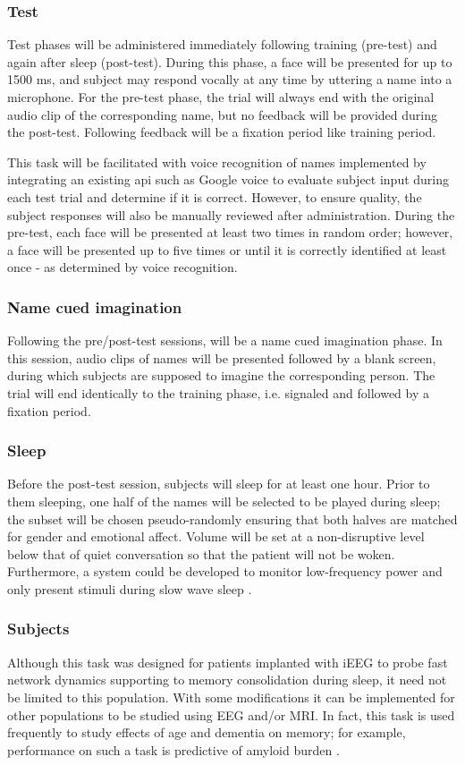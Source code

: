 \subsubsection*{Test}
Test phases will be administered immediately following training (pre-test) and again after sleep (post-test). During this phase, a face will be presented for up to 1500 ms, and subject may respond vocally at any time by uttering a name into a microphone. For the pre-test phase, the trial will always end with the original audio clip of the corresponding name, but no feedback will be provided during the post-test. Following feedback will be a fixation period like training period.

This task will be facilitated with voice recognition of names implemented by integrating an existing api such as Google voice to evaluate subject input during each test trial and determine if it is correct. However, to ensure quality, the subject responses will also be manually reviewed after administration. During the pre-test, each face will be presented at least two times in random order; however, a face will be presented up to five times or until it is correctly identified at least once - as determined by voice recognition.

\subsubsection*{Name cued imagination}
Following the pre/post-test sessions, will be a name cued imagination phase. In this session, audio clips of names will be presented followed by a blank screen, during which subjects are supposed to imagine the corresponding person. The trial will end identically to the training phase, i.e. signaled and followed by a fixation period.

\subsubsection*{Sleep}
Before the post-test session, subjects will sleep for at least one hour. Prior to them sleeping, one half of the names will be selected to be played during sleep; the subset will be chosen pseudo-randomly ensuring that both halves are matched for gender and emotional affect. Volume will be set at a non-disruptive level below that of quiet conversation so that the patient will not be woken. Furthermore, a system could be developed to monitor low-frequency power and only present stimuli during slow wave sleep .

\subsubsection*{Subjects}
Although this task was designed for patients implanted with iEEG to probe fast network dynamics supporting to memory consolidation during sleep, it need not be limited to this population. With some modifications it can be implemented for other populations to be studied using EEG and/or MRI. In fact, this task is used frequently to study effects of age and dementia on memory; for example, performance on such a task is predictive of amyloid burden \citep{Rentz2011, Vannini2012}.

